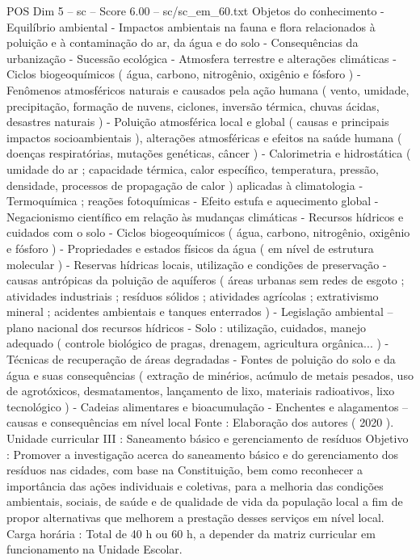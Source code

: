 \begin{textsample}{POS Dim 5 – sc – Score 6.00 – sc/sc\_em\_60.txt}
Objetos do conhecimento - Equilíbrio ambiental - Impactos ambientais na fauna e flora relacionados à poluição e à contaminação do ar, da água e do solo - Consequências da urbanização - Sucessão ecológica - Atmosfera terrestre e alterações climáticas - Ciclos biogeoquímicos ( água, carbono, nitrogênio, oxigênio e fósforo ) - Fenômenos atmosféricos naturais e causados pela ação humana ( vento, umidade, precipitação, formação de nuvens, ciclones, inversão térmica, chuvas ácidas, desastres naturais ) - Poluição atmosférica local e global ( causas e principais impactos socioambientais ), alterações atmosféricas e efeitos na saúde humana ( doenças respiratórias, mutações genéticas, câncer ) - Calorimetria e hidrostática ( umidade do ar ; capacidade térmica, calor específico, temperatura, pressão, densidade, processos de propagação de calor ) aplicadas à climatologia - Termoquímica ; reações fotoquímicas - Efeito estufa e aquecimento global - Negacionismo científico em relação às mudanças climáticas - Recursos hídricos e cuidados com o solo - Ciclos biogeoquímicos ( água, carbono, nitrogênio, oxigênio e fósforo ) - Propriedades e estados físicos da água ( em nível de estrutura molecular ) - Reservas hídricas locais, utilização e condições de preservação - causas antrópicas da poluição de aquíferos ( áreas urbanas sem redes de esgoto ; atividades industriais ; resíduos sólidos ; atividades agrícolas ; extrativismo mineral ; acidentes ambientais e tanques enterrados ) - Legislação ambiental – plano nacional dos recursos hídricos - Solo : utilização, cuidados, manejo adequado ( controle biológico de pragas, drenagem, agricultura orgânica... ) - Técnicas de recuperação de áreas degradadas - Fontes de poluição do solo e da água e suas consequências ( extração de minérios, acúmulo de metais pesados, uso de agrotóxicos, desmatamentos, lançamento de lixo, materiais radioativos, lixo tecnológico ) - Cadeias alimentares e bioacumulação - Enchentes e alagamentos – causas e consequências em nível local Fonte : Elaboração dos autores ( 2020 ).
Unidade curricular III : Saneamento básico e gerenciamento de resíduos Objetivo : Promover a investigação acerca do saneamento básico e do gerenciamento dos resíduos nas cidades, com base na Constituição, bem como reconhecer a importância das ações individuais e coletivas, para a melhoria das condições ambientais, sociais, de saúde e de qualidade de vida da população local a fim de propor alternativas que melhorem a prestação desses serviços em nível local.
Carga horária : Total de 40 h ou 60 h, a depender da matriz curricular em funcionamento na Unidade Escolar.

\end{textsample}
